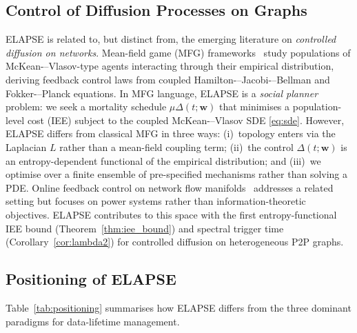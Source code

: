 \documentclass[review,12pt]{elsarticle}
\newcommand{\bfw}{\mathbf{w}}
\begin{document}
\subsection{Control of Diffusion Processes on Graphs}

ELAPSE is related to, but distinct from, the emerging literature on
\emph{controlled diffusion on networks}.
Mean-field game (MFG) frameworks~\cite{carmona2018probabilistic,achdou2020mean}
study populations of McKean-–Vlasov-type agents interacting through their
empirical distribution, deriving feedback control laws from coupled
Hamilton-–Jacobi-–Bellman and Fokker-–Planck equations.
In MFG language, ELAPSE is a \emph{social planner} problem: we seek a
mortality schedule $\mu\Delta(t;\bfw)$ that minimises a population-level cost
(IEE) subject to the coupled McKean-–Vlasov SDE \eqref{eq:sde}.
However, ELAPSE differs from classical MFG in three ways: (i)~topology enters
via the Laplacian $L$ rather than a mean-field coupling term; (ii)~the control
$\Delta(t;\bfw)$ is an entropy-dependent functional of the empirical
distribution; and (iii)~we optimise over a finite ensemble of pre-specified
mechanisms rather than solving a PDE.
Online feedback control on network flow
manifolds~\cite{bianchin2021online} addresses a related setting but focuses on
power systems rather than information-theoretic objectives.
ELAPSE contributes to this space with the first entropy-functional IEE bound
(Theorem~\ref{thm:iee_bound}) and spectral trigger time
(Corollary~\ref{cor:lambda2}) for controlled diffusion on heterogeneous P2P graphs.

\subsection{Positioning of ELAPSE}

Table~\ref{tab:positioning} summarises how ELAPSE differs from the three
dominant paradigms for data-lifetime management.
\end{document}
